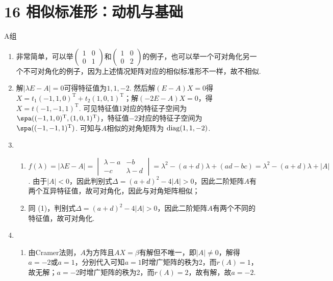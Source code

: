 \section*{16 相似标准形：动机与基础}

\vspace{2ex}

\centerline{\heiti A组}
\begin{enumerate}
    \item 非常简单，可以举$\begin{pmatrix}
                  1 & 0 \\ 0 & 1
              \end{pmatrix}$和$\begin{pmatrix}
                  1 & 0 \\ 0 & 2
              \end{pmatrix}$的例子，也可以举一个可对角化另一个不可对角化的例子，因为上述情况矩阵对应的相似标准形不一样，故不相似.

    \item 解$|\lambda E-A|=0$可得特征值为$1,1,-2$. 然后解$(E-A)X=0$得$X=t_1(-1,1,0)^\mathrm{T}+t_2(1,0,1)^\mathrm{T}$；解$(-2E-A)X=0$，得$X=t(-1,-1,1)^\mathrm{T}$. 可见特征值1对应的特征子空间为$\spa((-1,1,0)^\mathrm{T},(1,0,1)^\mathrm{T})$，特征值$-2$对应的特征子空间为 $\spa((-1,-1,1)^\mathrm{T})$. 可知与$A$相似的对角矩阵为 $\operatorname{diag}(1,1,-2)$.

    \item \begin{enumerate}
              \item $f(\lambda)=|\lambda E-A|=\begin{vmatrix}
                            \lambda-a & -b \\ -c & \lambda-d
                        \end{vmatrix}=\lambda^2-(a+d)\lambda+(ad-bc)=\lambda^2-(a+d)\lambda+|A|$. 由于$|A|<0$，因此判别式$\Delta=(a+d)^2-4|A|>0$，因此二阶矩阵$A$有两个互异特征值，故可对角化，因此与对角矩阵相似；

              \item 同 (1)，判别式$\Delta=(a+d)^2-4|A|>0$，因此二阶矩阵$A$有两个不同的特征值，故可对角化.
          \end{enumerate}

    \item \begin{enumerate}
              \item 由Cramer法则，$A$为方阵且$AX=\beta$有解但不唯一，即$|A|\neq 0$，解得$a=-2$或$a=1$，分别代入可知$a=1$时增广矩阵的秩为2，而$r(A)=1$，故无解；$a=-2$时增广矩阵的秩为2，而$r(A)=2$，故有解，故$a=-2$.


\end{enumerate}
\end{enumerate}
